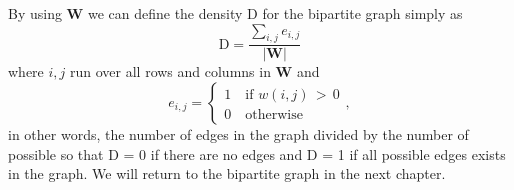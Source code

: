 By using $\textbf{W}$ we can define the density D for the bipartite graph simply as 
$$\text{D} = \frac{\sum_{i,j}e_{i,j}}{|\textbf{W}|}
$$
where $i,j$ run over all rows and columns in $\textbf{W}$ and
$$e_{i,j} =
    \left\{
        \begin{matrix}
            1\quad \text{if $w(i,j)\, >\, 0$} \\
            0\quad \text{otherwise}
        \end{matrix}
    \right. ,
$$
in other words, the number of edges in the graph divided by the number of possible so that D = 0 if there are no edges and D = 1 if all possible edges exists in the graph. We will return to the bipartite graph in the next chapter.
